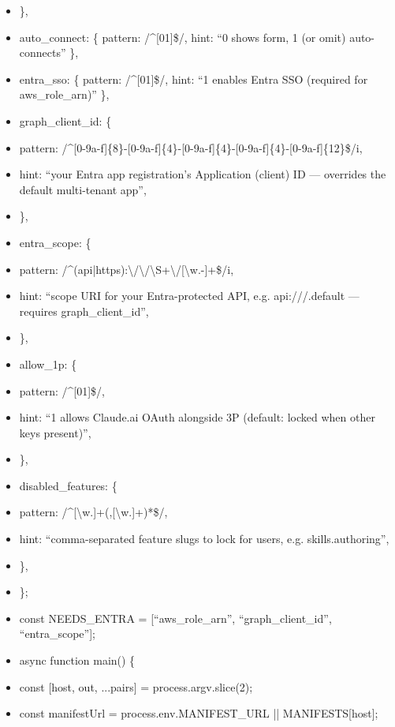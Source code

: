 \documentclass[11pt]{article}
\begin{document}
\begin{itemize}[leftmargin=*,itemsep=2pt,topsep=2pt]
\item {} \},
\item {} auto\_\allowbreak{}connect: \{ pattern: /\textasciicircum{}[01]\$/, hint: ``0 shows form, 1 (or omit) auto-connects'' \},
\item {} entra\_\allowbreak{}sso: \{ pattern: /\textasciicircum{}[01]\$/, hint: ``1 enables Entra SSO (required for aws\_\allowbreak{}role\_\allowbreak{}arn)'' \},
\item {} graph\_\allowbreak{}client\_\allowbreak{}id: \{
\item {} pattern: /\textasciicircum{}[0-9a-f]\{8\}-[0-9a-f]\{4\}-[0-9a-f]\{4\}-[0-9a-f]\{4\}-[0-9a-f]\{12\}\$/i,
\item {} hint: ``your Entra app registration's Application (client) ID — overrides the default multi-tenant app'',
\item {} \},
\item {} entra\_\allowbreak{}scope: \{
\item {} pattern: /\textasciicircum{}(api|https):\textbackslash{}/\textbackslash{}/\textbackslash{}S+\textbackslash{}/[\textbackslash{}w.-]+\$/i,
\item {} hint: ``scope URI for your Entra-protected API, e.g. api:///.default — requires graph\_\allowbreak{}client\_\allowbreak{}id'',
\item {} \},
\item {} allow\_\allowbreak{}1p: \{
\item {} pattern: /\textasciicircum{}[01]\$/,
\item {} hint: ``1 allows Claude.ai OAuth alongside 3P (default: locked when other keys present)'',
\item {} \},
\item {} disabled\_\allowbreak{}features: \{
\item {} pattern: /\textasciicircum{}[\textbackslash{}w.]+(,[\textbackslash{}w.]+)*\$/,
\item {} hint: ``comma-separated feature slugs to lock for users, e.g. skills.authoring'',
\item {} \},
\item {} \};
\item {} const NEEDS\_\allowbreak{}ENTRA = [``aws\_\allowbreak{}role\_\allowbreak{}arn'', ``graph\_\allowbreak{}client\_\allowbreak{}id'', ``entra\_\allowbreak{}scope''];
\item {} async function main() \{
\item {} const [host, out, ...pairs] = process.argv.slice(2);
\item {} const manifestUrl = process.env.MANIFEST\_\allowbreak{}URL || MANIFESTS[host];

\end{itemize}
\end{document}

